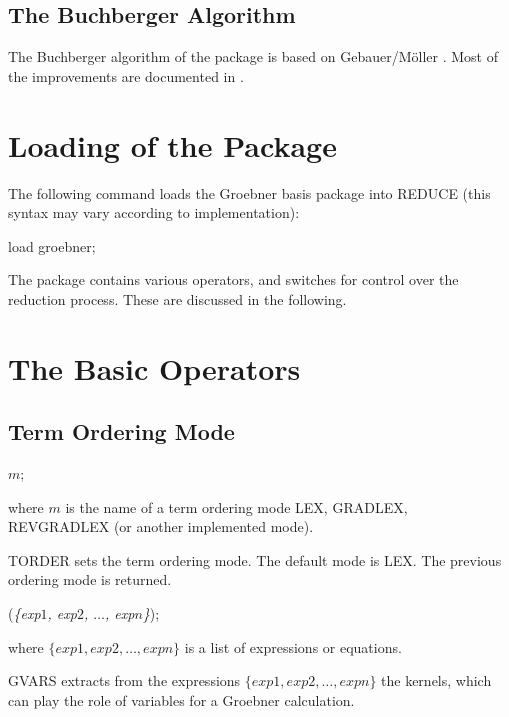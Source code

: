 \subsection{The Buchberger Algorithm}
The Buchberger algorithm of the package is based on {\sc
Gebauer/M\"oller} \cite{Gebauer:88}. Most of the
improvements are documented in \cite{Melenk:88}.

\section{Loading of the Package}
The following command loads the Groebner basis package into
REDUCE (this syntax may vary according to implementation):
\begin{center}
load groebner;
\end{center}

The package contains various operators, and switches for control
over the reduction process. These are discussed in the following.

\section{The Basic Operators}

\subsection{Term Ordering Mode}

\begin{description}
\item [{\it TORDER}] $m$;

where $m$ is the name of a term ordering mode LEX, GRADLEX,
REV\-GRAD\-LEX (or another implemented mode).

TORDER sets the term ordering mode.  The default mode is LEX. The
previous ordering mode is returned.

\item[{\it GVARS}] ({\it\{exp$1$, exp$2$, $ \ldots$, exp$n$\}});

 where $\{exp1, exp2, \ldots , expn\}$ is a list of expressions or
equations.

GVARS extracts from the expressions $\{exp1, exp2, \ldots , expn\}$
the kernels, which can play the role of variables for a Groebner
calculation. \end{description}

